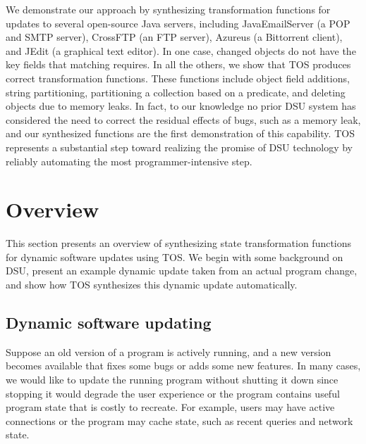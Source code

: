 \documentclass[natbib,10pt]{sigplanconf}
\newcommand{\TOS}{TOS\xspace}
\begin{document}
We demonstrate our approach by synthesizing transformation functions
for updates to several open-source Java servers, including
JavaEmailServer (a POP and SMTP server), CrossFTP (an FTP server),
Azureus (a Bittorrent client), and JEdit (a graphical text
editor). In one case, changed objects do not have the key fields
that matching requires. In all the others, we show that \TOS
produces correct transformation functions. These functions include object field
additions, string partitioning, partitioning a collection based on a
predicate, and deleting objects due to memory leaks.  In fact, to our
knowledge no prior DSU system has considered the need
to correct the residual effects of bugs, such as a memory leak, and our synthesized
functions are the first demonstration of this capability.  \TOS
represents a substantial step toward realizing the promise of DSU
technology by reliably automating the most programmer-intensive step.


\section{Overview}
\label{sec:overview}

This section presents an overview of synthesizing state transformation
functions for dynamic software updates using \TOS.  We begin with some
background on DSU, present an example dynamic update taken from an
actual program change, and show how \TOS synthesizes this dynamic update
automatically.

\subsection{Dynamic software updating}

Suppose an old version of a program is actively running, and a new
version becomes available that fixes some bugs or adds some new
features.  In many cases, we would like to update the running program
without shutting it down since stopping it would degrade the user
experience or the program contains useful program state that is costly
to recreate. For example, users may have active connections or the program
may cache state, such as recent queries and network state.
\end{document}
